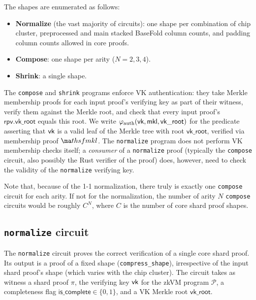 \documentclass[11pt]{article}
\begin{document}
The shapes are enumerated as follows:
\begin{itemize}
\item \textbf{Normalize} (the vast majority of circuits):
one shape per combination of chip cluster, preprocessed and main
stacked BaseFold column counts, and padding column counts allowed in core proofs.
\item \textbf{Compose}: one shape per arity ($N=2,3,4$).
\item \textbf{Shrink}: a single shape.
\end{itemize}

The \texttt{compose} and \texttt{shrink} programs enforce VK authentication:
they take Merkle membership proofs for each input proof's verifying key
as part of their witness, verify them against the Merkle root, and
check that every input proof's $\mathsf{rpv}.\mathsf{vk\_root}$
equals this root.
We write $\varphi_{\mathrm{auth}}(\mathsf{vk}, \mathsf{mkl}, \mathsf{vk\_root})$
for the predicate asserting that $\mathsf{vk}$ is a valid leaf of the Merkle tree
with root $\mathsf{vk\_root}$, verified via membership proof $\ma thsf{mkl}$.
The \texttt{normalize} program does not perform VK membership
checks itself; a \emph{consumer} of a \texttt{normalize} proof (typically the \texttt{compose} circuit, also possibly the Rust verifier
of the proof) does, however, need to check the validity of the \texttt{normalize} verifying key.

Note that, because of the 1-1 normalization, there truly is exactly one \texttt{compose} circuit for each
arity.
If not for the normalization, the number of arity $N$ \texttt{compose} circuits would be roughly $C^N$,
where $C$ is the number of core shard proof shapes.



\subsection{\texttt{normalize} circuit}\label{sec:normalize}
The \texttt{normalize} circuit proves the correct verification of a single
core shard proof. Its output is a proof of a fixed shape (\texttt{compress\_shape}),
irrespective of the input shard proof's shape (which varies with the chip cluster).
The circuit takes as witness a shard proof $\pi$, the verifying key $\mathsf{vk}$ for the zkVM program $\mathcal{P}$,
a completeness flag $\mathsf{is\_complete}\in\{0,1\}$,
and a VK Merkle root $\mathsf{vk\_root}$.
\end{document}
